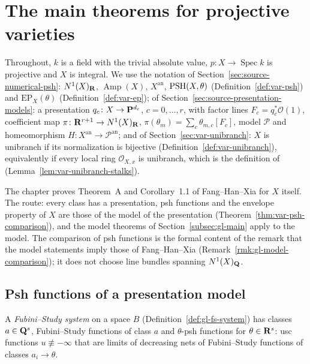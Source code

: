\section{The main theorems for projective varieties}
\label{sec:source-main}

Throughout, $k$ is a field with the trivial absolute value, $p\colon X\to\operatorname{Spec}k$
is projective and $X$ is integral. We use the notation of
Section~\ref{sec:source-numerical-psh}: $N^1(X)_{\mathbf{R}}$, $\operatorname{Amp}(X)$, $X^{\mathrm{an}}$,
$\operatorname{PSH}(X,\theta)$ (Definition~\ref{def:var-psh}) and $\mathrm{EP}_X(\theta)$
(Definition~\ref{def:var-ep}); of Section~\ref{sec:source-presentation-models}: a presentation
$q_c\colon X\to\mathbf{P}^{d_c}$, $c=0,\dots,r$, with factor lines $F_c=q_c^*\mathcal O(1)$, coefficient
map $\pi\colon\mathbf{R}^{r+1}\to N^1(X)_{\mathbf{R}}$, $\pi(\theta_m)=\sum_c\theta_{m,c}[F_c]$, model
$\mathcal P$ and homeomorphism $H\colon X^{\mathrm{an}}\to\mathcal P^{\mathrm{an}}$; and of
Section~\ref{sec:var-unibranch}: $X$ is unibranch if its normalization is bijective
(Definition~\ref{def:var-unibranch}), equivalently if every local ring $\mathcal O_{X,x}$ is
unibranch, which is the definition of \cite[\S1.1]{FHX}
(Lemma~\ref{lem:var-unibranch-stalks}).

The chapter proves Theorem~A and Corollary~1.1 of Fang--Han--Xia \cite{FHX} for $X$ itself.
The route: every class has a presentation, psh functions and the envelope property of $X$ are
those of the model of the presentation (Theorem~\ref{thm:var-psh-comparison}), and the model
theorems of Section~\ref{subsec:gl-main} apply to the model. The comparison of psh functions is
the formal content of the remark that the model statements imply those of Fang--Han--Xia
(Remark~\ref{rmk:gl-model-comparison}); it does not choose line bundles spanning $N^1(X)_{\mathbf{Q}}$.

\subsection{Psh functions of a presentation model}

A \emph{Fubini--Study system} on a space $B$ (Definition~\ref{def:gl-fs-system}) has classes
$a\in\mathbf{Q}^s$, Fubini--Study functions of class $a$ and $\theta$-psh functions for
$\theta\in\mathbf{R}^s$: usc functions $u\not\equiv-\infty$ that are limits of decreasing nets of
Fubini--Study functions of classes $a_i\to\theta$.

